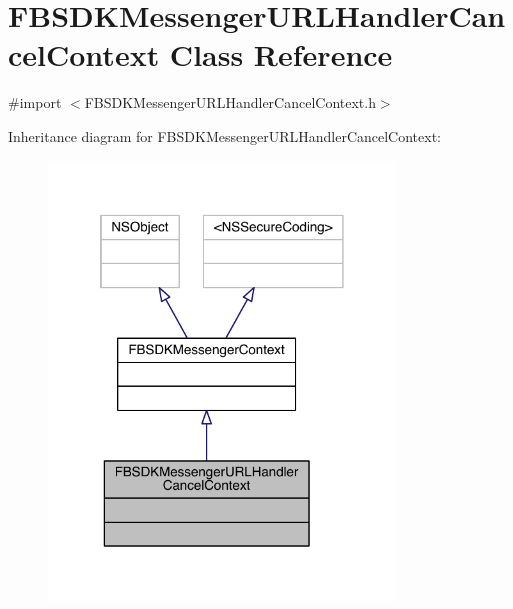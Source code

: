 \hypertarget{interface_f_b_s_d_k_messenger_u_r_l_handler_cancel_context}{\section{F\-B\-S\-D\-K\-Messenger\-U\-R\-L\-Handler\-Cancel\-Context Class Reference}
\label{interface_f_b_s_d_k_messenger_u_r_l_handler_cancel_context}
}


{\ttfamily \#import $<$F\-B\-S\-D\-K\-Messenger\-U\-R\-L\-Handler\-Cancel\-Context.\-h$>$}



Inheritance diagram for F\-B\-S\-D\-K\-Messenger\-U\-R\-L\-Handler\-Cancel\-Context\-:
\nopagebreak
\begin{figure}[H]
\begin{center}
\leavevmode
\includegraphics[width=261pt]{interface_f_b_s_d_k_messenger_u_r_l_handler_cancel_context__inherit__graph}
\end{center}
\end{figure}


